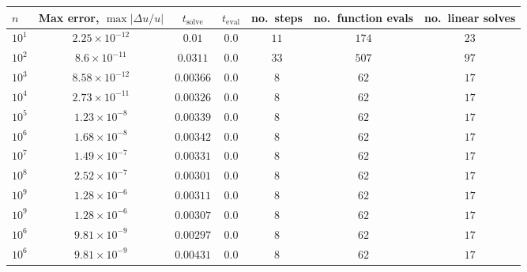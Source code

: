 \begin{tabular}{l c c c c c c}
\hline \hline 
$n$  &  Max error, $\max|\Delta u/u|$  &  $t_{\mathrm{solve}}$  &  $t_{\mathrm{eval}}$  &  no.\ steps  &  no.\ function evals  &  no.\ linear solves  \\ \hline
$10^1$  &  $2.25 \times 10^{-12}$  &  $0.01$  &  $0.0$  &  $11$  &  $174$  &  $23$ \\ 
$10^2$  &  $8.6 \times 10^{-11}$  &  $0.0311$  &  $0.0$  &  $33$  &  $507$  &  $97$ \\ 
$10^3$  &  $8.58 \times 10^{-12}$  &  $0.00366$  &  $0.0$  &  $8$  &  $62$  &  $17$ \\ 
$10^4$  &  $2.73 \times 10^{-11}$  &  $0.00326$  &  $0.0$  &  $8$  &  $62$  &  $17$ \\ 
$10^5$  &  $1.23 \times 10^{-8}$  &  $0.00339$  &  $0.0$  &  $8$  &  $62$  &  $17$ \\ 
$10^6$  &  $1.68 \times 10^{-8}$  &  $0.00342$  &  $0.0$  &  $8$  &  $62$  &  $17$ \\ 
$10^7$  &  $1.49 \times 10^{-7}$  &  $0.00331$  &  $0.0$  &  $8$  &  $62$  &  $17$ \\ 
$10^8$  &  $2.52 \times 10^{-7}$  &  $0.00301$  &  $0.0$  &  $8$  &  $62$  &  $17$ \\ 
$10^9$  &  $1.28 \times 10^{-6}$  &  $0.00311$  &  $0.0$  &  $8$  &  $62$  &  $17$ \\ 
$10^9$  &  $1.28 \times 10^{-6}$  &  $0.00307$  &  $0.0$  &  $8$  &  $62$  &  $17$ \\ 
$10^6$  &  $9.81 \times 10^{-9}$  &  $0.00297$  &  $0.0$  &  $8$  &  $62$  &  $17$ \\ 
$10^6$  &  $9.81 \times 10^{-9}$  &  $0.00431$  &  $0.0$  &  $8$  &  $62$  &  $17$ \\ 
\hline \hline
\end{tabular}

